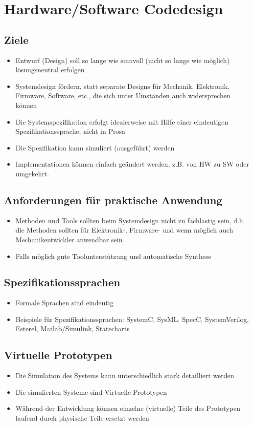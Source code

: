 \section{Hardware/Software Codedesign}
\subsection{Ziele}
	\begin{itemize}
		\item Entwurf (Design) soll so lange wie sinnvoll (nicht so lange wie möglich) lösungsneutral erfolgen
		\item Systemdesign fördern, statt separate Designs für Mechanik, Elektronik, Firmware, Software, etc., die sich unter Umständen auch widersprechen können
		\item Die Systemspezifikation erfolgt idealerweise mit Hilfe einer eindeutigen Spezifikationssprache, nicht in Prosa		
		\item Die Spezifikation kann simuliert (ausgeführt) werden
		\item Implementationen können einfach geändert werden, z.B. von HW zu SW oder umgekehrt. 		
	\end{itemize}
	
\subsection{Anforderungen für praktische Anwendung}
	\begin{itemize}
		\item Methoden und Tools sollten beim Systemdesign nicht zu fachlastig sein, d.h. die Methoden sollten für Elektronik-, Firmware- und wenn möglich auch Mechanikentwickler anwendbar sein
		\item Falls möglich gute Toolunterstützung und automatische Synthese
	\end{itemize}
	
\subsection{Spezifikationssprachen}
	\begin{itemize}
		\item Formale Sprachen sind eindeutig
		\item Beispiele für Spezifikationssprachen: SystemC, SysML, SpecC, SystemVerilog, Esterel, Matlab/Simulink, Statecharts
	\end{itemize}
	
\subsection{Virtuelle Prototypen}
	\begin{itemize}
		\item Die Simulation des Systems kann unterschiedlich stark detailliert werden		
		\item Die simulierten Systeme sind Virtuelle Prototypen
		\item Während der Entwicklung können einzelne (virtuelle) Teile des Prototypen laufend durch physische Teile ersetzt werden		
	\end{itemize}
	
